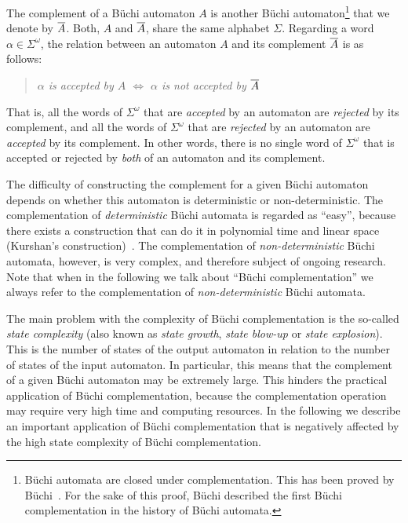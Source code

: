 The complement of a Büchi automaton $A$ is another Büchi automaton\footnote{Büchi automata are closed under complementation. This has been proved by Büchi~\cite{buchi1960decision}. For the sake of this proof, Büchi described the first Büchi complementation in the history of Büchi automata.} that we denote by $\cl1{A}$. Both, $A$ and $\cl1{A}$, share the same alphabet $\Sigma$. Regarding a word $\alpha \in \Sigma^\omega$, the relation between an automaton $A$ and its complement $\cl1{A}$ is as follows:

\begin{quote}
\centering
\textit{$\alpha$ is accepted by $A$ $\Longleftrightarrow$ $\alpha$ is not accepted by $\cl1{A}$}
\end{quote}

That is, all the words of $\Sigma^\omega$ that are \textit{accepted} by an automaton are \textit{rejected} by its complement, and all the words of $\Sigma^\omega$ that are \textit{rejected} by an automaton are \textit{accepted} by its complement. In other words, there is no single word of $\Sigma^\omega$ that is  accepted or rejected by \textit{both} of an automaton and its complement.

The difficulty of constructing the complement for a given Büchi automaton depends on whether this automaton is deterministic or non-deterministic. The complementation of \textit{deterministic} Büchi automata is regarded as ``easy'', because there exists a construction that can do it in polynomial time and linear space (Kurshan's construction)~\cite{Kurshan198759}. The complementation of \textit{non-deterministic} Büchi automata, however, is very complex, and therefore subject of ongoing research. Note that when in the following we talk about ``Büchi complementation'' we always refer to the complementation of \textit{non-deterministic} Büchi automata.

The main problem with the complexity of Büchi complementation is the so-called \textit{state complexity} (also known as \textit{state growth}, \textit{state blow-up} or \textit{state explosion}). This is the number of states of the output automaton in relation to the number of states of the input automaton. In particular, this means that the complement of a given Büchi automaton may be extremely large. This hinders the practical application of Büchi complementation, because the complementation operation may require very high time and computing resources. In the following we describe an important application of Büchi complementation that is negatively affected by the high state complexity of Büchi complementation.

